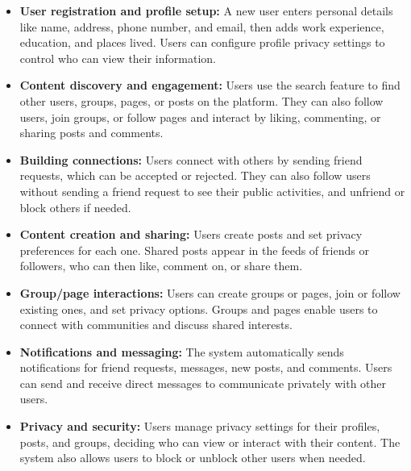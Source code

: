 \begin{itemize}
\item
\protect{}\label{AuV0Co4XpK-grkB9NK3WZ}
\textbf{User registration and profile setup:} A new user enters personal details like name, address, phone number, and email, then adds work experience, education, and places lived. Users can configure profile privacy settings to control who can view their information.
\item
\protect{}\label{9qre6dlYIEvBIbtEUEoGL}
\textbf{Content discovery and engagement:} Users use the search feature to find other users, groups, pages, or posts on the platform. They can also follow users, join groups, or follow pages and interact by liking, commenting, or sharing posts and comments.
\item
\protect{}\label{NWiwMtqBARIJdj6vDp9ir}
\textbf{Building connections:} Users connect with others by sending friend requests, which can be accepted or rejected. They can also follow users without sending a friend request to see their public activities, and unfriend or block others if needed.
\item
\protect{}\label{QgCOCA4_3aWBgDtodYP7G}
\textbf{Content creation and sharing:} Users create posts and set privacy preferences for each one. Shared posts appear in the feeds of friends or followers, who can then like, comment on, or share them.
\item
\protect{}\label{LP-GXeBTSWz9BbZA17A5Q}
\textbf{Group/page interactions:} Users can create groups or pages, join or follow existing ones, and set privacy options. Groups and pages enable users to connect with communities and discuss shared interests.
\item
\protect{}\label{ZE_fn84dJ6xQd9_H-dST9}
\textbf{Notifications and messaging:} The system automatically sends notifications for friend requests, messages, new posts, and comments. Users can send and receive direct messages to communicate privately with other users.
\item
\protect{}\label{NAVaM1lKC6NByeyIYWJot}
\textbf{Privacy and security:} Users manage privacy settings for their profiles, posts, and groups, deciding who can view or interact with their content. The system also allows users to block or unblock other users when needed.
\end{itemize}

